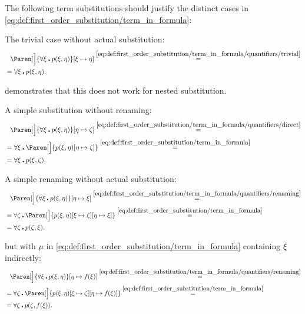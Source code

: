 \begin{example}\label{ex:first_order_substitution}
  The following term substitutions should justify the distinct cases in \eqref{eq:def:first_order_substitution/term_in_formula}:
  \begin{ExEnum}
     The trivial case without actual substitution:
    \begin{align*}
      &{}\phantom{=}{}
      \Paren[\Big]{\forall \xi \centerdot p(\xi, \eta)}[\xi \mapsto \eta]
      \overset {\eqref{eq:def:first_order_substitution/term_in_formula/quantifiers/trivial}} = \\ &=
      \forall \xi \centerdot p(\xi, \eta).
    \end{align*}

     demonstrates that this does not work for nested substitution.

     A simple substitution without renaming:
    \begin{align*}
      &{}\phantom{=}{}
      \Paren[\Big]{\forall \xi \centerdot p(\xi, \eta)}[\eta \mapsto \zeta]
      \overset {\eqref{eq:def:first_order_substitution/term_in_formula/quantifiers/direct}} = \\ &=
      \forall \xi \centerdot \Paren[\Big]{p(\xi, \eta)[\eta \mapsto \zeta]}
      \overset {\eqref{eq:def:first_order_substitution/term_in_formula}} = \\ &=
      \forall \xi \centerdot p(\xi, \zeta).
    \end{align*}

     A simple renaming without actual substitution:
    \begin{align*}
      &{}\phantom{=}{}
      \Paren[\Big]{\forall \xi \centerdot p(\xi, \eta)}[\eta \mapsto \xi]
      \overset {\eqref{eq:def:first_order_substitution/term_in_formula/quantifiers/renaming}} = \\ &=
      \forall \zeta \centerdot \Paren[\Big]{p(\xi, \eta)[\xi \mapsto \zeta][\eta \mapsto \xi]}
      \overset {\eqref{eq:def:first_order_substitution/term_in_formula}} = \\ &=
      \forall \zeta \centerdot p(\zeta, \xi).
    \end{align*}

      but with \( \mu \) in \eqref{eq:def:first_order_substitution/term_in_formula} containing \( \xi \) indirectly:
    \begin{align*}
      &{}\phantom{=}{}
      \Paren[\Big]{\forall \xi \centerdot p(\xi, \eta)}[\eta \mapsto f(\xi)]
      \overset {\eqref{eq:def:first_order_substitution/term_in_formula/quantifiers/renaming}} = \\ &=
      \forall \zeta \centerdot \Paren[\Big]{p(\xi, \eta)[\xi \mapsto \zeta][\eta \mapsto f(\xi)]}
      \overset {\eqref{eq:def:first_order_substitution/term_in_formula}} = \\ &=
      \forall \zeta \centerdot p(\zeta, f(\xi)).
    \end{align*}


\end{ExEnum}
\end{example}
